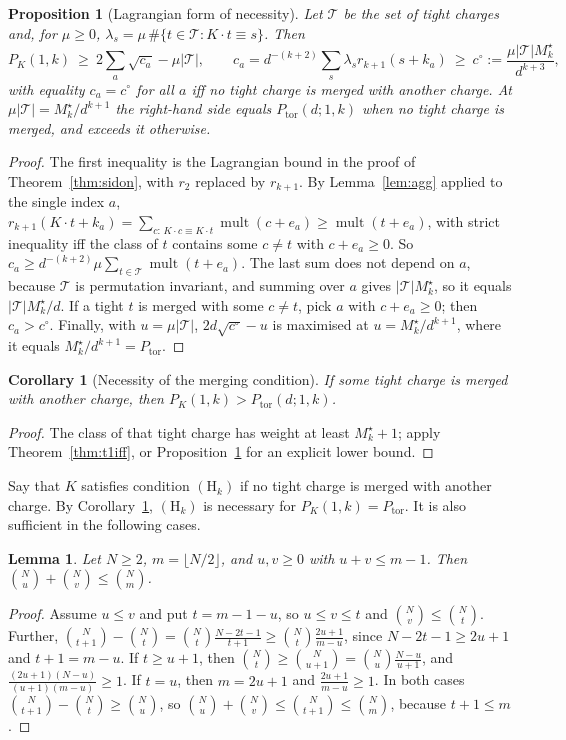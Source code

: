 \documentclass[11pt]{article}
\newcommand{\mult}{\operatorname{mult}}
\newcommand{\Ptor}{P_{\mathrm{tor}}}
\newtheorem{lemma}[theorem]{Lemma}
\newtheorem{proposition}[theorem]{Proposition}
\newtheorem{corollary}[theorem]{Corollary}
\theoremstyle{definition}
\theoremstyle{remark}
\begin{document}
\begin{proposition}[Lagrangian form of necessity]\label{prop:t1lag}
Let $\mathcal T$ be the set of tight charges and, for $\mu\ge0$, $\lambda_s=\mu\,\#\{t\in\mathcal T:K\cdot t\equiv s\}$. Then
\[
P_K(1,k)\ \ge\ 2\sum_a\sqrt{c_a}-\mu|\mathcal T|,\qquad c_a=d^{-(k+2)}\sum_s\lambda_sr_{k+1}(s+k_a)\ \ge\ c^\circ:=\frac{\mu|\mathcal T|M^\star_k}{d^{k+3}},
\]
with equality $c_a=c^\circ$ for all $a$ iff no tight charge is merged with another charge. At $\mu|\mathcal T|=M^\star_k/d^{k+1}$ the
right-hand side equals $\Ptor(d;1,k)$ when no tight charge is merged, and exceeds it otherwise.
\end{proposition}
\begin{proof}
The first inequality is the Lagrangian bound in the proof of Theorem~\ref{thm:sidon}, with $r_2$ replaced by $r_{k+1}$. By
Lemma~\ref{lem:agg} applied to the single index $a$, $r_{k+1}(K\cdot t+k_a)=\sum_{c:\,K\cdot c\equiv K\cdot t}\mult(c+e_a)\ge\mult(t+e_a)$, with
strict inequality iff the class of $t$ contains some $c\ne t$ with $c+e_a\ge0$. So
$c_a\ge d^{-(k+2)}\mu\sum_{t\in\mathcal T}\mult(t+e_a)$. The last sum does not depend on $a$, because $\mathcal T$ is permutation invariant,
and summing over $a$ gives $|\mathcal T|M^\star_k$, so it equals $|\mathcal T|M^\star_k/d$. If a tight $t$ is merged with some $c\ne t$,
pick $a$ with $c+e_a\ge0$; then $c_a>c^\circ$. Finally, with $u=\mu|\mathcal T|$, $2d\sqrt{c^\circ}-u$ is maximised at $u=M^\star_k/d^{k+1}$,
where it equals $M^\star_k/d^{k+1}=\Ptor$.
\end{proof}

\begin{corollary}[Necessity of the merging condition]\label{cor:t1nec}
If some tight charge is merged with another charge, then $P_K(1,k)>\Ptor(d;1,k)$.
\end{corollary}
\begin{proof}
The class of that tight charge has weight at least $M^\star_k+1$; apply Theorem~\ref{thm:t1iff}, or Proposition~\ref{prop:t1lag} for an
explicit lower bound.
\end{proof}

Say that $K$ satisfies condition $(\mathrm H_k)$ if no tight charge is merged with another charge. By Corollary~\ref{cor:t1nec},
$(\mathrm H_k)$ is necessary for $P_K(1,k)=\Ptor$. It is also sufficient in the following cases.

\begin{lemma}\label{lem:binom}
Let $N\ge2$, $m=\lfloor N/2\rfloor$, and $u,v\ge0$ with $u+v\le m-1$. Then $\binom Nu+\binom Nv\le\binom Nm$.
\end{lemma}
\begin{proof}
Assume $u\le v$ and put $t=m-1-u$, so $u\le v\le t$ and $\binom Nv\le\binom Nt$. Further,
$\binom N{t+1}-\binom Nt=\binom Nt\frac{N-2t-1}{t+1}\ge\binom Nt\frac{2u+1}{m-u}$, since $N-2t-1\ge2u+1$ and $t+1=m-u$. If $t\ge u+1$, then
$\binom Nt\ge\binom N{u+1}=\binom Nu\frac{N-u}{u+1}$, and $\frac{(2u+1)(N-u)}{(u+1)(m-u)}\ge1$. If $t=u$, then $m=2u+1$ and
$\frac{2u+1}{m-u}\ge1$. In both cases $\binom N{t+1}-\binom Nt\ge\binom Nu$, so
$\binom Nu+\binom Nv\le\binom N{t+1}\le\binom Nm$, because $t+1\le m$.
\end{proof}
\end{document}
